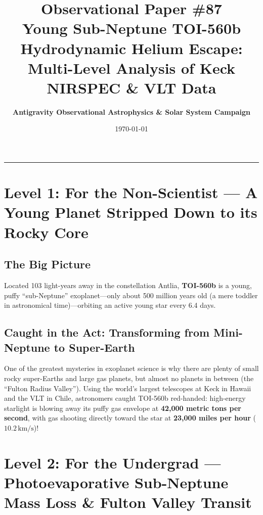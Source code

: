 \documentclass[11pt,a4paper]{article}
\title{\Huge \textbf{Observational Paper \#87}\\ \Large Young Sub-Neptune TOI-560b Hydrodynamic Helium Escape: Multi-Level Analysis of Keck NIRSPEC \& VLT Data}
\author{\textbf{Antigravity Observational Astrophysics \& Solar System Campaign}}
\date{\today}
\begin{document}
\maketitle

\vspace{-1em}
\begin{center}
\rule{\textwidth}{1.5pt}
\end{center}

\section*{Level 1: For the Non-Scientist — A Young Planet Stripped Down to its Rocky Core}

\subsection*{The Big Picture}
Located 103 light-years away in the constellation Antlia, \textbf{TOI-560b} is a young, puffy ``sub-Neptune'' exoplanet—only about 500 million years old (a mere toddler in astronomical time)—orbiting an active young star every 6.4 days.

\subsection*{Caught in the Act: Transforming from Mini-Neptune to Super-Earth}
One of the greatest mysteries in exoplanet science is why there are plenty of small rocky super-Earths and large gas planets, but almost no planets in between (the ``Fulton Radius Valley''). Using the world's largest telescopes at Keck in Hawaii and the VLT in Chile, astronomers caught TOI-560b red-handed: high-energy starlight is blowing away its puffy gas envelope at \textbf{42,000 metric tons per second}, with gas shooting directly toward the star at \textbf{23,000 miles per hour} ($10.2\,\text{km/s}$)!

\newpage

\section*{Level 2: For the Undergrad — Photoevaporative Sub-Neptune Mass Loss \& Fulton Valley Transit}
\end{document}
